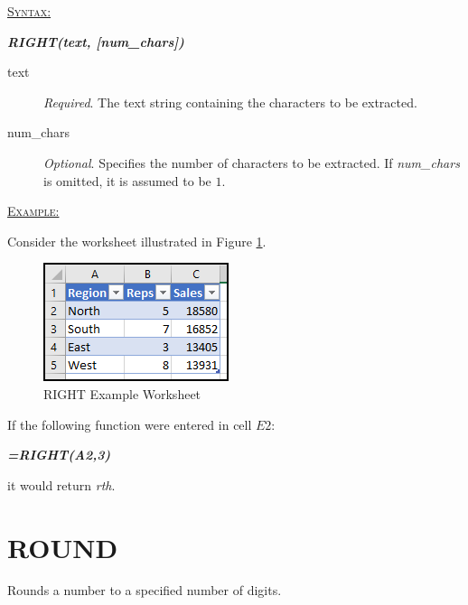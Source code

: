 \begin{addmargin}[1cm]{0cm}
	
	\medskip
	\underline{\textsc{Syntax:}}
	\medskip
	
	{\color{Syntax}
		\noindent\textbf{\textit{RIGHT(text, [num\_chars])}}
	}
	
	\begin{description}
		\item[text] \textit{Required}. The text string containing the characters to be extracted.
		\item[num\_chars] \textit{Optional}. Specifies the number of characters to be extracted. If \textit{num\_chars} is omitted, it is assumed to be $ 1 $.
	\end{description}

	\medskip
	\noindent\underline{\textsc{Example:}}
	\medskip
	
	\noindent Consider the worksheet illustrated in Figure \ref{apa:rig}.
	
	\begin{figure}[H]
		\centering
		\includegraphics[width=\maxwidth{.45\linewidth}]{gfx/apa_fig01}
		\caption{RIGHT Example Worksheet}
		\label{apa:rig}
	\end{figure}
	
	\noindent If the following function were entered in cell $ E2 $:
	
	{\color{Syntax}
		\textit{\textbf{=RIGHT(A2,3)}}
	}
	
	\noindent it would return \textit{rth}.

\end{addmargin}

\section{ROUND}

Rounds a number to a specified number of digits.  

